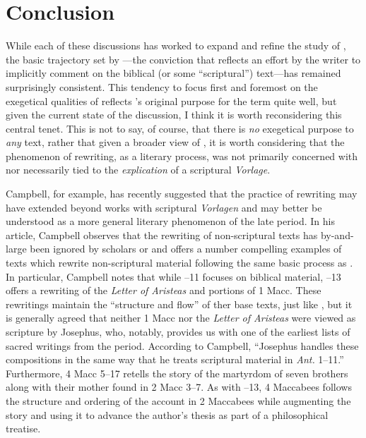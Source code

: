 
\section{Conclusion}

While each of these discussions has worked to expand and refine the study of \rwb, the basic trajectory set by \vermes---the conviction that \rwb reflects an effort by the writer to implicitly comment on the biblical (or some ``scriptural'') text---has remained surprisingly consistent. This tendency to focus first and foremost on the exegetical qualities of \rwb reflects \vermes's original purpose for the term quite well, but given the current state of the discussion, I think it is worth reconsidering this central tenet. This is not to say, of course, that there is \emph{no} exegetical purpose to \emph{any} \rwb text, rather that given a broader view of \rwb, it is worth considering that the phenomenon of rewriting, as a literary process, was not primarily concerned with nor necessarily tied to the \emph{explication} of a scriptural \emph{Vorlage}. 

Campbell, for example, has recently suggested that the practice of rewriting may have extended beyond works with scriptural \emph{Vorlagen} and may better be understood as a more general literary phenomenon of the late \secondtemple period.\autocite{campbell_zsengeller2014} In his article, Campbell observes that the rewriting of non-scriptural texts has by-and-large been ignored by scholars or \rwb and offers a number compelling examples of \secondtemple texts which rewrite non-scriptural material following the same basic process as \rwb. In particular, Campbell notes that while --11 focuses on biblical material, --13 offers a rewriting of the \emph{Letter of Aristeas} and portions of 1 Macc. These rewritings maintain the ``structure and flow'' of ther base texts, just like \rwb, but it is generally agreed that neither 1 Macc nor the \emph{Letter of Aristeas} were viewed as scripture by Josephus, who, notably, provides us with one of the earliest lists of sacred writings from the period.\autocite{mason2002_mcdonald-sanders2002} According to Campbell, ``Josephus handles these compositions in the same way that he treats scriptural material in \emph{Ant.} 1--11.''\autocites[70]{campbell_zsengeller2014}[See also][126]{mason2002_mcdonald-sanders2002} Furthermore, 4 Macc 5--17 retells the story of the martyrdom of seven brothers along with their mother found in 2 Macc 3--7. As with --13, 4 Maccabees follows the structure and ordering of the account in 2 Maccabees while augmenting the story and using it to advance the author's thesis as part of a philosophical treatise. 

